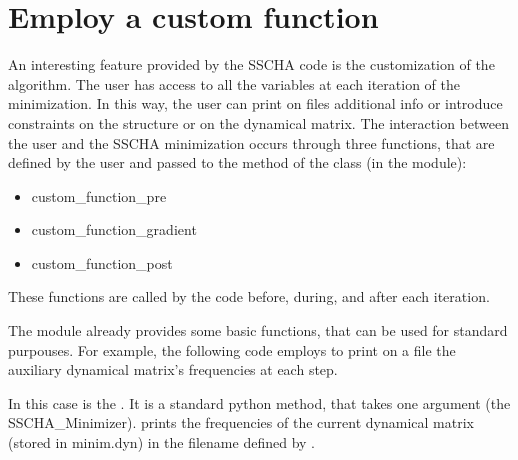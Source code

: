 \documentclass[a4paper,11pt,english]{sphinxmanual}
\begin{document}
\section{Employ a custom function}
\label{\detokenize{advanced:employ-a-custom-function}}
\sphinxAtStartPar
An interesting feature provided by the SSCHA code is the customization of the algorithm. The user has access to all the variables at each iteration of the minimization.
In this way, the user can print on files additional info or introduce constraints on the structure or on the dynamical matrix.
The interaction between the user and the SSCHA minimization occurs through three functions, that are defined by the user and passed to the  method of the  class (in the  module):
\begin{itemize}
\item {} 
\sphinxAtStartPar
custom\_function\_pre

\item {} 
\sphinxAtStartPar
custom\_function\_gradient

\item {} 
\sphinxAtStartPar
custom\_function\_post

\end{itemize}

\sphinxAtStartPar
These functions are called by the code before, during, and after each iteration.

\sphinxAtStartPar
The  module already provides some basic functions, that can be used for standard purpouses.
For example, the following code employs  to print on a file the auxiliary dynamical matrix’s frequencies at each step.

\begin{sphinxVerbatim}[commandchars=\\\{\}]
  
   
\end{sphinxVerbatim}

\sphinxAtStartPar
In this case  is the . It is a standard python method, that takes one argument (the SSCHA\_Minimizer).
  prints the frequencies of the current dynamical matrix (stored in minim.dyn) in the filename defined by .
\end{document}
